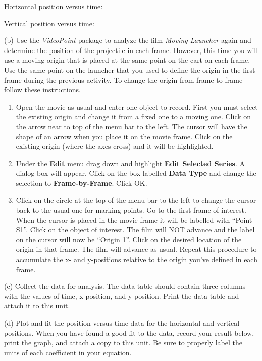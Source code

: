 Horizontal position versus time:
\vspace{10mm}

Vertical position versus time:
\vspace{10mm}

(b) Use the \emph{VideoPoint} package to analyze the film \emph{Moving
Launcher} again and determine the position of the projectile in each
frame. However, this time you will use a moving origin that is placed
at the same point on the cart on each frame. Use the same point on
the launcher that you used to define the origin in the first frame
during the previous activity. To change the origin from frame to frame
follow these instructions.

\begin{enumerate}
\item Open the movie as usual and enter one object to record. First you
must select the existing origin and change it from a fixed one to
a moving one. Click on the arrow near to top of the menu bar to the
left. The cursor will have the shape of an arrow when you place it
on the movie frame. Click on the existing origin (where the axes cross)
and it will be highlighted.
\item Under the \textbf{Edit} menu drag down and highlight \textbf{Edit
Selected Series}. A dialog box will appear. Click on the box labelled
\textbf{Data Type} and change the selection to \textbf{Frame-by-Frame}.
Click OK.
\item Click on the circle at the top of the menu bar to the left to change
the cursor back to the usual one for marking points. Go to the first
frame of interest. When the cursor is placed in the movie frame it
will be labelled with {}``Point S1''. Click on the object of interest.
The film will NOT advance and the label on the cursor will now be
{}``Origin 1''. Click on the desired location of the origin in that
frame. The film will advance as usual. Repeat this procedure to accumulate
the x- and y-positions relative to the origin you've defined in each
frame.
\end{enumerate}
(c) Collect the data for analysis. The data table should contain three
columns with the values of time, x-position, and y-position.
Print the data table and attach it to this unit.

(d) Plot and fit the position versus time data for the horizontal
and vertical positions. 
When you have found a good fit to the data, record your
result below, print the graph, and attach a copy to this unit. Be
sure to properly label the units of each coefficient in your equation.

